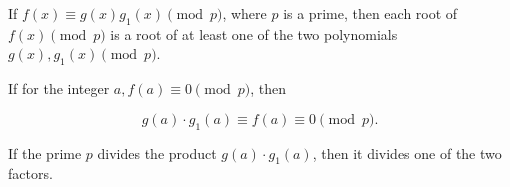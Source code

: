 If $f(x) \equiv g(x)g_1(x) \pmod{p}$, where $p$ is a prime, then each root of $f(x) \pmod{p}$ is a root of at least one of the two polynomials $g(x), g_1(x) \pmod{p}$.

If for the integer $a, f(a) \equiv 0 \pmod{p}$, then

$$g(a) \cdot g_1(a) \equiv f(a) \equiv 0 \pmod{p}.$$

If the prime $p$ divides the product $g(a) \cdot g_1(a)$, then it divides one of the two factors.
